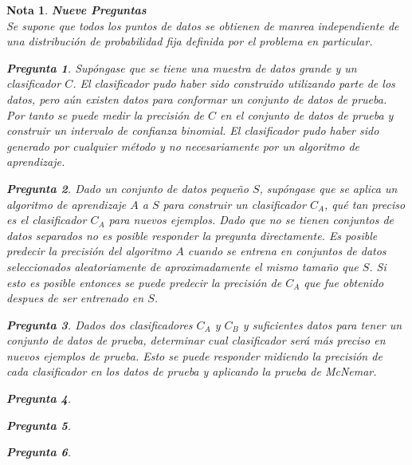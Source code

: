\documentclass[12pt]{article}
\newtheorem{Note}{Nota}%
\newtheorem{Quest}{Pregunta}[section]
\begin{document}
\begin{Note}\textbf{Nueve Preguntas}\\
Se supone que todos los puntos de datos se obtienen de manrea independiente de una distribuci\'on de probabilidad fija definida por el problema en particular.
\begin{Quest}
Sup\'ongase que se tiene una muestra de datos grande y un clasificador $C$. El clasificador pudo haber sido construido utilizando parte de los datos, pero a\'un existen datos para conformar un conjunto de datos de prueba. Por tanto se puede medir la precisi\'on de $C$ en el conjunto de datos de prueba y construir un intervalo de confianza binomial. El clasificador pudo haber sido generado por cualquier m\'etodo y no necesariamente por un algoritmo de aprendizaje.
\end{Quest}

\begin{Quest}
Dado un conjunto de datos peque\~no $S$, sup\'ongase que se aplica un algoritmo de aprendizaje $A$ a $S$ para construir un clasificador $C_{A}$, qu\'e tan preciso es el clasificador $C_A$ para nuevos ejemplos. Dado que no se tienen conjuntos de datos separados no es posible responder la pregunta directamente. Es posible predecir la precisi\'on del algoritmo $A$ cuando se entrena en conjuntos de datos seleccionados aleatoriamente de aproximadamente el mismo tama\~no que $S$. Si esto es posible entonces se puede predecir la precisi\'on de $C_A$ que fue obtenido  despues de ser entrenado en $S$. 

\end{Quest}


\begin{Quest}
Dados dos clasificadores $C_A$ y $C_B$ y suficientes datos para tener un conjunto de datos de prueba, determinar cual clasificador ser\'a m\'as preciso en nuevos ejemplos de prueba.  Esto se puede responder midiendo la precisi\'on de cada clasificador en los datos de prueba y aplicando la prueba de McNemar.

\end{Quest}


\begin{Quest}


\end{Quest}


\begin{Quest}


\end{Quest}


\begin{Quest}



\end{Quest}
\end{Note}
\end{document}
